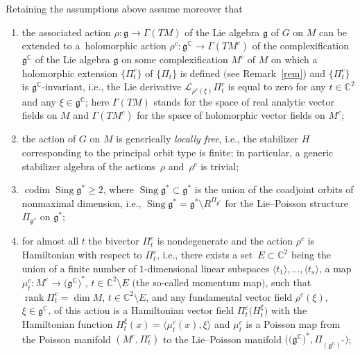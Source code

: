 \begin{Theorem}\label{below} Retaining the assumptions above assume moreover that
\begin{enumerate}\itemsep=0pt
\item[$(a)$] the associated action $\rho\colon \mathfrak{g}\to\Gamma(TM)$ of the Lie algebra $\mathfrak{g}$ of $G$ on $M$ can be extended to a~holomorphic action $\rho^c\colon \mathfrak{g}^\mathbb{C}\to\Gamma(T {M}^c)$ of the complexification $\mathfrak{g}^\mathbb{C}$ of the Lie algebra $\mathfrak{g}$ on some complexification ${M}^c$ of $M$ on which a holomorphic extension $\{{\Pi}^c_t\}$ of $\{\Pi_t\}$ is defined $($see Remark~{\rm \ref{rem})} and $\{{\Pi}^c_t\}$ is $\mathfrak{g}^\mathbb{C}$-invariant, i.e., the Lie derivative $\mathcal{L}_{\rho^c(\xi)} {\Pi}^c_t$ is equal to zero for any $t\in\mathbb{C}^2$ and any $\xi\in\mathfrak{g}^\mathbb{C}$; here $\Gamma(TM)$ stands for the space of real analytic vector fields on $M$ and $\Gamma(T {M}^c)$ for the space of holomorphic vector fields on ${M}^c$;
\item[$(b)$] the action of $G$ on $M$ is generically {\it locally free}, i.e., the stabilizer $H$ corresponding to the
principal orbit type is finite; in particular, a generic stabilizer algebra of the actions~$\rho$ and~$\rho^c$ is trivial;
\item[$(c)$] $\operatorname{codim}\operatorname{Sing}\mathfrak{g}^*\ge 2$, where $\operatorname{Sing}\mathfrak{g}^* \subset \mathfrak{g}^*$ is the union of the coadjoint orbits of nonmaximal dimension, i.e., $\operatorname{Sing}\mathfrak{g}^*=\mathfrak{g}^*\setminus R^{\Pi_{\mathfrak{g}^*}}$ for the Lie--Poisson structure $\Pi_{\mathfrak{g}^*}$ on $\mathfrak{g}^*$;
\item[$(d)$] for almost all $t$ the bivector ${\Pi}^c_t$ is nondegenerate and the action $\rho^c$ is Hamiltonian with respect to ${\Pi}^c_t$, i.e., there exists a set~$E \subset\mathbb{C}^2$ being the union of a finite number of $1$-dimensional linear subspaces $\langle t_1\rangle, \dots,\langle t_s\rangle$, a map $\mu^c_t\colon {M}^c\to \big(\mathfrak{g}^\mathbb{C}\big)^*$, $t\in\mathbb{C}^2\setminus E$ $($the so-called momentum map$)$, such that $\operatorname{rank} {\Pi}^c_t=\dim M$, $t\in \mathbb{C}^2\setminus E$, and any fundamental vector field $\rho^c(\xi)$, $\xi\in\mathfrak{g}^\mathbb{C}$, of this action is a Hamiltonian vector field ${\Pi}^c_t\big(H_t^\xi\big)$ with the Hamiltonian function $H_t^\xi(x)=\langle \mu^c_t(x),\xi\rangle$ and $\mu^c_t$ is a Poisson map from the Poisson manifold $({M}^c,{\Pi}^c_t)$ to the Lie--Poisson manifold $\big(\big(\mathfrak{g}^\mathbb{C}\big)^*,\Pi_{(\mathfrak{g}^\mathbb{C})^*}\big)$;

\end{enumerate}
\end{Theorem}

